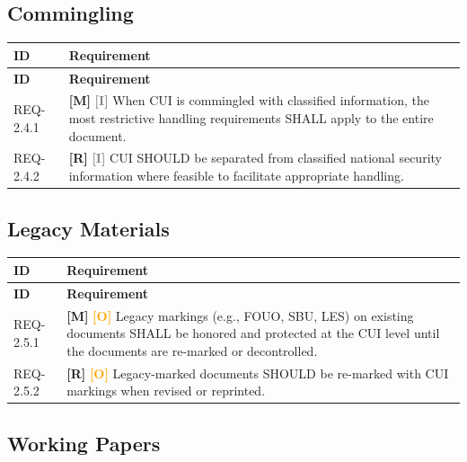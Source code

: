 \documentclass[11pt,letterpaper]{article}
\begin{document}
\subsection{Commingling}

\begin{longtable}{@{}p{1.4cm}p{11.6cm}@{}}
\toprule
\textbf{ID} & \textbf{Requirement} \\
\midrule
\endfirsthead
\toprule
\textbf{ID} & \textbf{Requirement} \\
\midrule
\endhead

REQ-2.4.1 & \textcolor{mandatory}{\textbf{[M]}} \textcolor{gray}{\textbf{[I]}} When CUI is commingled with classified information, the most restrictive handling requirements SHALL apply to the entire document. \\[6pt]

REQ-2.4.2 & \textcolor{recommended}{\textbf{[R]}} \textcolor{gray}{\textbf{[I]}} CUI SHOULD be separated from classified national security information where feasible to facilitate appropriate handling. \\[6pt]

\bottomrule
\end{longtable}

\subsection{Legacy Materials}

\begin{longtable}{@{}p{1.4cm}p{11.6cm}@{}}
\toprule
\textbf{ID} & \textbf{Requirement} \\
\midrule
\endfirsthead
\toprule
\textbf{ID} & \textbf{Requirement} \\
\midrule
\endhead

REQ-2.5.1 & \textcolor{mandatory}{\textbf{[M]}} \textcolor{orange}{\textbf{[O]}} Legacy markings (e.g., FOUO, SBU, LES) on existing documents SHALL be honored and protected at the CUI level until the documents are re-marked or decontrolled. \\[6pt]

REQ-2.5.2 & \textcolor{recommended}{\textbf{[R]}} \textcolor{orange}{\textbf{[O]}} Legacy-marked documents SHOULD be re-marked with CUI markings when revised or reprinted. \\[6pt]

\bottomrule
\end{longtable}

\subsection{Working Papers}
\end{document}
